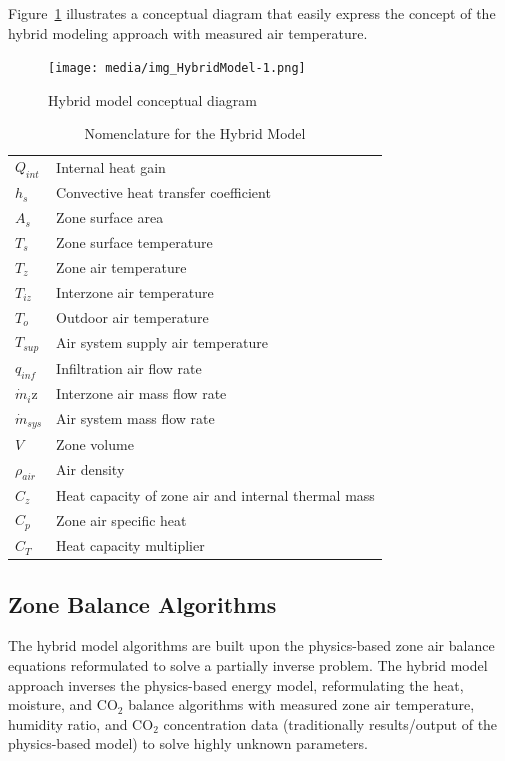 \documentclass[11pt]{article}
\begin{document}
Figure~\ref{fig:hybrid-model-conceptual-diagram} illustrates a conceptual diagram that easily express the concept of the hybrid modeling approach with measured air temperature. 

\begin{figure}[h]
\begin{center}
\texttt{[image: media/img\_HybridModel-1.png]}
\caption{Hybrid model conceptual diagram}\protect \label{fig:hybrid-model-conceptual-diagram}
\end{center}
\end{figure}



\begin{table}
\caption{Nomenclature for the Hybrid Model}
\begin{tabular}{ll}
$Q_{int}$ & Internal heat gain\\
$h_s$ & Convective heat transfer coefficient\\
$A_s$ & Zone surface area\\
$T_s$ & Zone surface temperature\\
$T_z$ & Zone air temperature\\
$T_{iz}$ & Interzone air temperature\\
$T_o$ & Outdoor air temperature\\
$T_{sup}$ & Air system supply air temperature\\
$q_{inf}$ & Infiltration air flow rate\\
$\dot{m}_i$z & Interzone air mass flow rate\\
$\dot{m}_{sys}$ & Air system mass flow rate\\
$V$ & Zone volume\\
$\rho_{air}$ & Air density\\
$C_z$ & Heat capacity of zone air and internal thermal mass\\
$C_p$ & Zone air specific heat\\
$C_T$ & Heat capacity multiplier\\
\end{tabular}
\end{table}


\subsection{Zone Balance Algorithms}\label{Zone-air-balance-algorithms}
The hybrid model algorithms are built upon the physics-based zone air balance equations reformulated to solve a partially inverse problem. The hybrid model approach inverses the physics-based energy model, reformulating the heat, moisture, and CO$_2$ balance algorithms with measured zone air temperature, humidity ratio, and CO$_2$ concentration data (traditionally results/output of the physics-based model) to solve highly unknown parameters.
\end{document}
